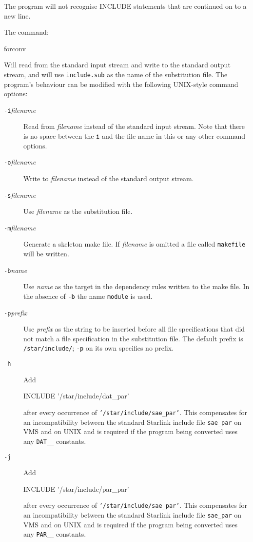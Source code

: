 \documentclass[11pt,nolof]{starlink}
\begin{document}
The program will not recognise INCLUDE statements that are continued
on to a new line.

The command:
\begin{terminalv}
forconv
\end{terminalv}
Will read from the standard input stream and write to the standard output
stream, and will use \texttt{include.sub} as the name of the substitution file.
The program's behaviour can be modified with the following UNIX-style
command options:
\begin{description}

\item[\texttt{-i}\emph{filename}] Read from \emph{filename} instead of the
standard input stream. Note that there is no space between the \texttt{i}
and the file name in this or any other command options.

\item[\texttt{-o}\emph{filename}] Write to \emph{filename} instead of the
standard output stream.

\item[\texttt{-s}\emph{filename}] Use \emph{filename} as the substitution file.

\item[\texttt{-m}\emph{filename}] Generate a skeleton make file. If \emph{filename} is omitted a file called \texttt{makefile} will be written.

\item[\texttt{-b}\emph{name}] Use \emph{name} as the target in the dependency
rules written to the make file. In the absence of \texttt{-b} the name \texttt{module} is used.

\item[\texttt{-p}\emph{prefix}] Use \emph{prefix} as the string to be inserted
before all file specifications that did not match a file specification
in the substitution file. The default prefix is \texttt{/star/include/};
\texttt{-p} on its own specifies no prefix.

\item[\texttt{-h}] Add
\begin{terminalv}
INCLUDE '/star/include/dat_par'
\end{terminalv}
after every occurrence of \texttt{'/star/include/sae\_par'}. This
compensates for an incompatibility between the standard Starlink include
file \texttt{sae\_par} on VMS and on
UNIX and is required if the program being converted uses any \texttt{DAT\_\_}
constants.

\item[\texttt{-j}] Add
\begin{terminalv}
INCLUDE '/star/include/par_par'
\end{terminalv}
after every occurrence of \texttt{'/star/include/sae\_par'}. This
compensates for an incompatibility between the standard Starlink include
file \texttt{sae\_par} on VMS and on
UNIX and is required if the program being converted uses any \texttt{PAR\_\_}
constants.


\end{description}
\end{document}
